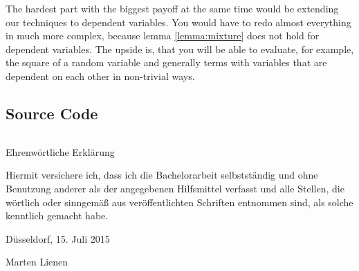 \documentclass[11pt,a4paper]{book}
\begin{document}
The hardest part with the biggest payoff at the same time would be extending our
techniques to dependent variables. You would have to redo almost everything in
much more complex, because lemma \ref{lemma:mixture} does not hold for dependent
variables. The upside is, that you will be able to evaluate, for example, the
square of a random variable and generally terms with variables that are
dependent on each other in non-trivial ways.

\begin{appendices}
  \chapter{Source Code}
  \label{ch:source}

  \inputminted{julia}{src/Transforms.jl}
\end{appendices}

\printbibliography

\pagestyle{empty}
\cleardoublepage

\vspace*{10em}
{\LARGE Ehrenwörtliche Erklärung}
\vspace{1em}

Hiermit versichere ich, dass ich die Bachelorarbeit selbstständig und ohne
Benutzung anderer als der angegebenen Hilfsmittel verfasst und alle Stellen, die
wörtlich oder sinngemäß aus veröffentlichten Schriften entnommen sind, als
solche kenntlich gemacht habe.

\vspace{5em}

\begin{minipage}{0.4\textwidth}
  \begin{flushleft}
    Düsseldorf, 15. Juli 2015
  \end{flushleft}
\end{minipage}
\hfill
\begin{minipage}{0.4\textwidth}
  \begin{flushright}
    Marten Lienen
  \end{flushright}
\end{minipage}
\end{document}
